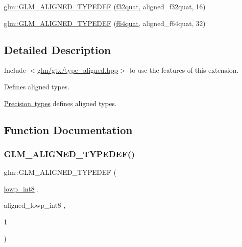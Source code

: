 \begin{DoxyCompactItemize}
\item 
\mbox{\hyperlink{group__gtx__type__aligned_ga1ed8aeb5ca67fade269a46105f1bf273}{glm\+::\+G\+L\+M\+\_\+\+A\+L\+I\+G\+N\+E\+D\+\_\+\+T\+Y\+P\+E\+D\+EF}} (\mbox{\hyperlink{group__gtc__type__precision_gac59c4d798396552e4bbb866b3d8a2f18}{f32quat}}, aligned\+\_\+f32quat, 16)
\item 
\mbox{\hyperlink{group__gtx__type__aligned_ga95cc03b8b475993fa50e05e38e203303}{glm\+::\+G\+L\+M\+\_\+\+A\+L\+I\+G\+N\+E\+D\+\_\+\+T\+Y\+P\+E\+D\+EF}} (\mbox{\hyperlink{group__gtc__type__precision_ga5b54d7b36fbee5e271f73e6ed74e7172}{f64quat}}, aligned\+\_\+f64quat, 32)
\end{DoxyCompactItemize}


\subsection{Detailed Description}
Include $<$\mbox{\hyperlink{gtx_2type__aligned_8hpp}{glm/gtx/type\+\_\+aligned.\+hpp}}$>$ to use the features of this extension.

Defines aligned types.

\mbox{\hyperlink{group__core__precision}{Precision types}} defines aligned types. 

\subsection{Function Documentation}
\mbox{\label{group__gtx__type__aligned_gab5cd5c5fad228b25c782084f1cc30114}} 
\subsubsection{\texorpdfstring{G\+L\+M\+\_\+\+A\+L\+I\+G\+N\+E\+D\+\_\+\+T\+Y\+P\+E\+D\+E\+F()}{GLM\_ALIGNED\_TYPEDEF()}\hspace{0.1cm}{\footnotesize\ttfamily [1/209]}}
{\footnotesize\ttfamily glm\+::\+G\+L\+M\+\_\+\+A\+L\+I\+G\+N\+E\+D\+\_\+\+T\+Y\+P\+E\+D\+EF (\begin{DoxyParamCaption}\item[{\mbox{\hyperlink{group__gtc__type__precision_gaf9e675b6392764242ae87eb179e9d3d6}{lowp\+\_\+int8}}}]{,  }\item[{aligned\+\_\+lowp\+\_\+int8}]{,  }\item[{1}]{ }\end{DoxyParamCaption})}

